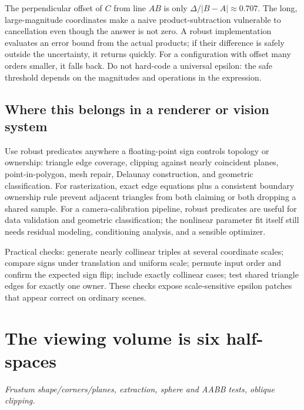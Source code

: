 The perpendicular offset of \(C\) from line \(AB\) is only \(\Delta/|B-A|\approx0.707\). The long, large-magnitude coordinates make a naive product-subtraction vulnerable to cancellation even though the answer is not zero. A robust implementation evaluates an error bound from the actual products; if their difference is safely outside the uncertainty, it returns quickly. For a configuration with offset many orders smaller, it falls back. Do not hard-code a universal epsilon: the safe threshold depends on the magnitudes and operations in the expression.

\subsection{Where this belongs in a renderer or vision system}\label{02-foundations-ii-ch034-where-this-belongs-in-a-renderer-or-vision-system}

\hypertarget{02-foundations-ii-ch034-where-this-belongs-in-a-renderer-or-vision-system}{}

Use robust predicates anywhere a floating-point sign controls topology or ownership: triangle edge coverage, clipping against nearly coincident planes, point-in-polygon, mesh repair, Delaunay construction, and geometric classification. For rasterization, exact edge equations plus a consistent boundary ownership rule prevent adjacent triangles from both claiming or both dropping a shared sample. For a camera-calibration pipeline, robust predicates are useful for data validation and geometric classification; the nonlinear parameter fit itself still needs residual modeling, conditioning analysis, and a sensible optimizer.

Practical checks: generate nearly collinear triples at several coordinate scales; compare signs under translation and uniform scale; permute input order and confirm the expected sign flip; include exactly collinear cases; test shared triangle edges for exactly one owner. These checks expose scale-sensitive epsilon patches that appear correct on ordinary scenes.

\section{The viewing volume is six half-spaces}\label{02-foundations-ii-ch034-the-viewing-volume-is-six-half-spaces}

\hypertarget{02-foundations-ii-ch034-the-viewing-volume-is-six-half-spaces}{}

\emph{Frustum shape/corners/planes, extraction, sphere and AABB tests, oblique clipping.}

